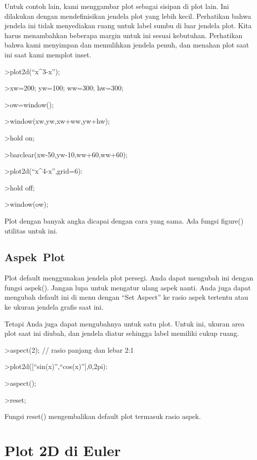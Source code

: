 \documentclass[
]{book}
\begin{document}
Untuk contoh lain, kami menggambar plot sebagai sisipan di plot lain. Ini dilakukan dengan mendefinisikan jendela plot yang lebih kecil. Perhatikan bahwa jendela ini tidak menyediakan ruang untuk label sumbu di luar jendela plot. Kita harus menambahkan beberapa margin untuk ini sesuai kebutuhan. Perhatikan bahwa kami menyimpan dan memulihkan jendela penuh, dan menahan plot saat ini saat kami memplot inset.

\textgreater plot2d(``x\^{}3-x'');

\textgreater xw=200; yw=100; ww=300; hw=300;

\textgreater ow=window();

\textgreater window(xw,yw,xw+ww,yw+hw);

\textgreater hold on;

\textgreater barclear(xw-50,yw-10,ww+60,ww+60);

\textgreater plot2d(``x\^{}4-x'',grid=6):

\textgreater hold off;

\textgreater window(ow);

Plot dengan banyak angka dicapai dengan cara yang sama. Ada fungsi figure() utilitas untuk ini.

\section{Aspek~Plot}\label{aspek-plot}

Plot default menggunakan jendela plot persegi. Anda dapat mengubah ini dengan fungsi aspek(). Jangan lupa untuk mengatur ulang aspek nanti. Anda juga dapat mengubah default ini di menu dengan ``Set Aspect'' ke rasio aspek tertentu atau ke ukuran jendela grafis saat ini.

Tetapi Anda juga dapat mengubahnya untuk satu plot. Untuk ini, ukuran area plot saat ini diubah, dan jendela diatur sehingga label memiliki cukup ruang.

\textgreater aspect(2); // rasio panjang dan lebar 2:1

\textgreater plot2d({[}``sin(x)'',``cos(x)''{]},0,2pi):

\textgreater aspect();

\textgreater reset;

Fungsi reset() mengembalikan default plot termasuk rasio aspek.

\chapter{Plot 2D di Euler}\label{plot-2d-di-euler}
\end{document}
